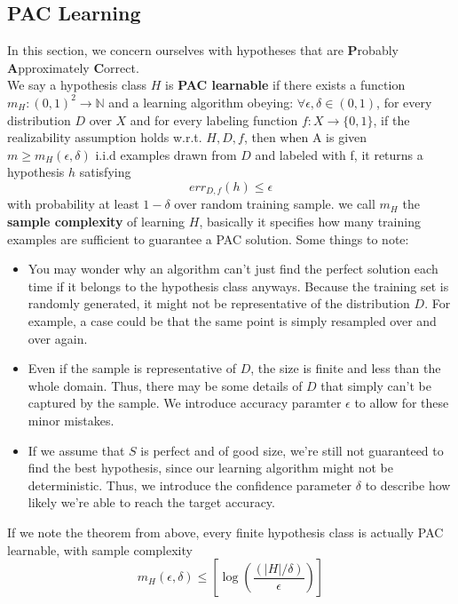 \documentclass[11pt]{article}
\begin{document}
\subsection{PAC Learning}
In this section, we concern ourselves with hypotheses that are \textbf{P}robably \textbf{A}pproximately \textbf{C}orrect. 
\\

\noindent We say a hypothesis class \( H \) is \textbf{PAC learnable} if there exists a function \( m_{H} : (0,1)^{2} \to \mathbb{N} \) and a learning algorithm obeying:
 \( \forall \epsilon,\delta \in (0,1) \), for every distribution \( D \) over \( X \) and for every labeling function \( f : X \to \{0,1\}   \), if the realizability
 assumption holds w.r.t. \( H, D, f \), then when A is given \( m \geq m_{H}(\epsilon, \delta) \) i.i.d examples drawn from \( D \) and labeled with f, it returns a hypothesis
 \( h \) satisfying 
 \[ 
     err_{D,f}(h) \leq \epsilon 
 \]
with probability at least \( 1-\delta \) over random training sample. we call \( m_{H} \) the \textbf{sample complexity} of learning \( H \), basically it specifies how many training examples
are sufficient to guarantee a PAC solution. Some things to note:
\begin{itemize}
    \item You may wonder why an algorithm can't just find the perfect solution each time if it belongs to the hypothesis class anyways. Because the training set is randomly generated, it might not
    be representative of the distribution \( D \). For example, a case could be that the same point is simply resampled over and over again. 
    \item Even if the sample is representative of \( D \), the size is finite and less than the whole domain. Thus, there may be some details of \( D \) that simply can't be captured by the sample. We
    introduce accuracy paramter \( \epsilon \) to allow for these minor mistakes. 
    \item If we assume that \( S \) is perfect and of good size, we're still not guaranteed to find the best hypothesis, since our learning algorithm might not be deterministic. Thus, we introduce the 
    confidence parameter \( \delta \) to describe how likely we're able to reach the target accuracy.
\end{itemize}

\noindent If we note the theorem from above, every finite hypothesis class is actually PAC learnable, with sample complexity  
\[ 
    m_{H}(\epsilon, \delta) \leq \left[\log{\left( \frac{(|H|/\delta)}{\epsilon} \right)}\right] 
\]
\\
\end{document}
